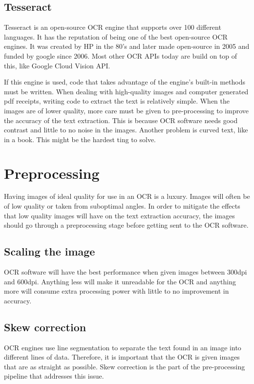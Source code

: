 \subsection{Tesseract}\label{subsec:Tesseract}
Tesseract is an open-source OCR engine that supports over 100 different languages.
It has the reputation of being one of the best open-source OCR engines.
It was created by HP in the 80's and later made open-source in 2005 and funded by google since 2006.
Most other OCR APIs today are build on top of this, like Google Cloud Vision API.

If this engine is used, code that takes advantage of the engine's built-in methods must be written.
When dealing with high-quality images and computer generated pdf receipts, writing code to extract the text is relatively simple.
When the images are of lower quality, more care must be given to pre-processing to improve the accuracy of the text
extraction.
This is because OCR software needs good contrast and little to no noise in the images.
Another problem is curved text, like in a book.
This might be the hardest ting to solve.

\section{Preprocessing}\label{sec:preprocessing}
Having images of ideal quality for use in an OCR is a luxury.
Images will often be of low quality or taken from suboptimal angles.
In order to mitigate the effects that low quality images will have on the text extraction accuracy, the images should go through a preprocessing stage before getting sent to the OCR software.

\subsection{Scaling the image}\label{subsec:scaling-the-image}
OCR software will have the best performance when given images between 300dpi and 600dpi.
Anything less will make it unreadable for the OCR and anything more will consume extra processing power with little to no improvement in accuracy.

\subsection{Skew correction}\label{subsec:skew-correction}
OCR engines use line segmentation to separate the text found in an image into different lines of data.
Therefore, it is important that the OCR is given images that are as straight as possible.
Skew correction is the part of the pre-processing pipeline that addresses this issue.

